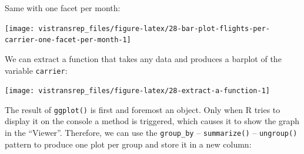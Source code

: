 \documentclass[]{book}
\newenvironment{Shaded}{}{}
\newcommand{\ControlFlowTok}[1]{\textcolor[rgb]{0.00,0.00,1.00}{#1}}
\newcommand{\DataTypeTok}[1]{#1}
\newcommand{\KeywordTok}[1]{\textcolor[rgb]{0.00,0.00,1.00}{#1}}
\newcommand{\NormalTok}[1]{#1}
\newcommand{\OperatorTok}[1]{#1}
\newcommand{\StringTok}[1]{\textcolor[rgb]{0.00,0.50,0.50}{#1}}
\begin{document}
Same with one facet per month:

\begin{Shaded}
\end{Shaded}

\begin{flushright}\texttt{[image: vistransrep\_files/figure-latex/28-bar-plot-flights-per-carrier-one-facet-per-month-1]} \end{flushright}

We can extract a function that takes any data and produces a barplot of the variable \texttt{carrier}:

\begin{Shaded}
\end{Shaded}

\begin{flushright}\texttt{[image: vistransrep\_files/figure-latex/28-extract-a-function-1]} \end{flushright}

The result of \texttt{ggplot()} is first and foremost an object.
Only when R tries to display it on the console a method is triggered, which causes it to show the graph in the ``Viewer''.
Therefore, we can use the \texttt{group\_by} -- \texttt{summarize()} -- \texttt{ungroup()} pattern to produce one plot per group and store it in a new column:

\begin{Shaded}
\end{Shaded}
\end{document}
